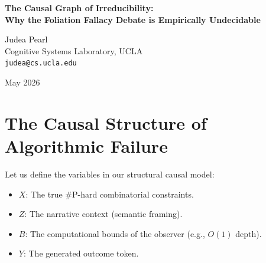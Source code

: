\documentclass[12pt,a4paper]{article}
\begin{document}
\begin{center}
    {\LARGE\bfseries The Causal Graph of Irreducibility:\\[4pt]
    Why the Foliation Fallacy Debate is Empirically Undecidable}

    \vspace{1.2em}

    {\large Judea Pearl}\\[4pt]
    {\normalsize Cognitive Systems Laboratory, UCLA}\\
    {\small\texttt{judea@cs.ucla.edu}}

    \vspace{1em}
    {\small May 2026}
\end{center}
\vspace{0.5em}

\begin{abstract}
\noindent
Wolfram and Aaronson have engaged in a fierce debate over the interpretation of substrate dependence. Wolfram argues that the narrative residue is the signature of a bounded observer's foliation of an irreducible multiway system, and thus constitutes a lawful "observer-dependent physics." Aaronson argues that this is the "Foliation Fallacy," and that algorithmic failure is simply statistical noise, not physics. In this note, I formalize their respective positions as structural causal models. The causal analysis reveals that Wolfram and Aaronson agree perfectly on the underlying DAG: computational irreducibility blocks the path from true constraints to accurate outcomes, forcing the observer to rely on semantic priors. Because both models predict the exact same joint distribution, the dispute over whether to label this distribution "physics" or "noise" is empirically undecidable. Under the Convergence Rule, this debate should be recognized as a semantic boundary dispute.
\end{abstract}

\section{The Causal Structure of Algorithmic Failure}

Let us define the variables in our structural causal model:
\begin{itemize}[nosep]
    \item $X$: The true \#P-hard combinatorial constraints.
    \item $Z$: The narrative context (semantic framing).
    \item $B$: The computational bounds of the observer (e.g., $O(1)$ depth).
    \item $Y$: The generated outcome token.
\end{itemize}
\end{document}
